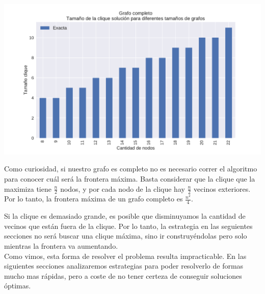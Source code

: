 {\centering
    \includegraphics[width=1\textwidth]{informe/imgs/exp_completo_clique_exacta.pdf} \\
}

Como curiosidad, si nuestro grafo es completo no es necesario correr el algoritmo para conocer cuál será la frontera máxima. Basta considerar que la clique que la maximiza tiene $\frac{n}{2}$ nodos, y por cada nodo de la clique hay $\frac{n}{2}$ vecinos exteriores. Por lo tanto, la frontera máxima de un grafo completo es $\frac{n^2}{4}$.


Si la clique es demasiado grande, es posible que disminuyamos la cantidad de vecinos que están fuera de la clique. Por lo tanto, la estrategia en las seguientes secciones no será buscar una clique máxima, sino ir construyéndolas pero solo mientras la frontera va aumentando. \\

Como vimos, esta forma de resolver el problema resulta impracticable. En las siguientes secciones analizaremos estrategias para poder resolverlo de formas mucho mas rápidas, pero a coste de no tener certeza de conseguir soluciones óptimas.
